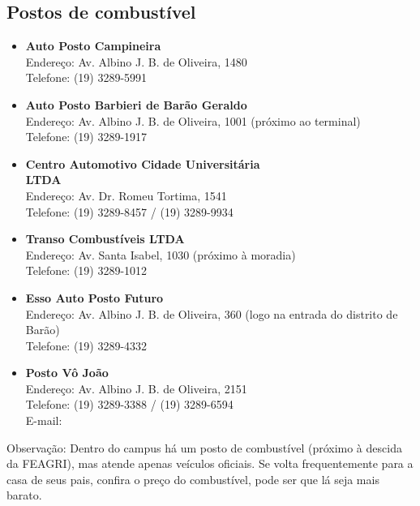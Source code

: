 \subsection{Postos de combustível}

\begin{itemize}
\item \textbf{Auto Posto Campineira}
  \\Endereço: Av. Albino J. B. de Oliveira, 1480
  \\Telefone: (19) 3289-5991

\item \textbf{Auto Posto Barbieri de Barão Geraldo}
  \\Endereço: Av. Albino J. B. de Oliveira, 1001 (próximo ao terminal)
  \\Telefone: (19) 3289-1917

\item \textbf{Centro Automotivo Cidade Universitária\\LTDA}
  \\Endereço: Av. Dr. Romeu Tortima, 1541
  \\Telefone: (19) 3289-8457 / (19) 3289-9934

\item \textbf{Transo Combustíveis LTDA}
  \\Endereço: Av. Santa Isabel, 1030 (próximo à moradia)
  \\Telefone: (19) 3289-1012

\item \textbf{Esso Auto Posto Futuro}
  \\Endereço: Av. Albino J. B. de Oliveira, 360 (logo na entrada do distrito de
  Barão)
  \\Telefone: (19) 3289-4332

\item \textbf{Posto Vô João}
  \\Endereço: Av. Albino J. B. de Oliveira, 2151
  \\Telefone: (19) 3289-3388 / (19) 3289-6594
  \\E-mail: 
\end{itemize}


Observação: Dentro do campus há um posto de combustível (próximo à descida da
FEAGRI), mas atende apenas veículos oficiais. Se volta frequentemente para a
casa de seus pais, confira o preço do combustível, pode ser que lá seja mais
barato.
